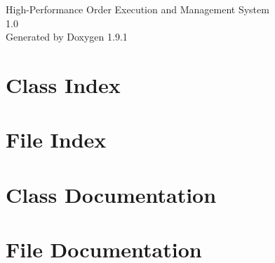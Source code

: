 \let\mypdfximage\pdfximage\def\pdfximage{\immediate\mypdfximage}\documentclass[twoside]{book}
\newcommand{\+}{\discretionary{\mbox{\scriptsize$\hookleftarrow$}}{}{}}
\newcommand{\clearemptydoublepage}{%
  \newpage{\pagestyle{empty}\cleardoublepage}%
}
\begin{document}
\raggedbottom

\hypersetup{pageanchor=false,
             bookmarksnumbered=true,
             pdfencoding=unicode
            }
\begin{titlepage}
\vspace*{7cm}
\begin{center}%
{\Large High-\/\+Performance Order Execution and Management System \\[1ex]\large 1.\+0 }\\
\vspace*{1cm}
{\large Generated by Doxygen 1.9.1}\\
\end{center}
\end{titlepage}
\clearemptydoublepage
{}
\tableofcontents
\clearemptydoublepage
{}
\hypersetup{pageanchor=true}

\chapter{Class Index}

\chapter{File Index}

\chapter{Class Documentation}


\chapter{File Documentation}



\backmatter
\newpage
{}
\clearemptydoublepage
{}
\printindex
\end{document}
